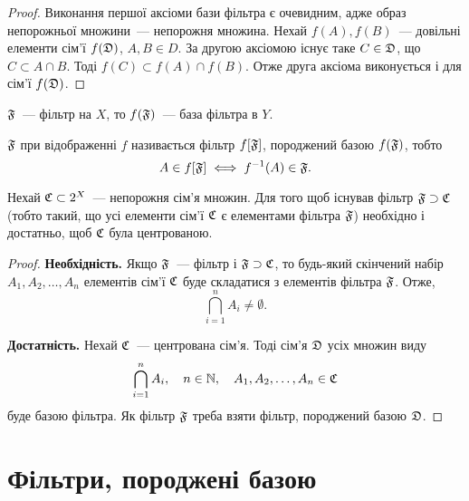 \begin{proof}
    Виконання першої аксіоми бази фільтра є очевидним, адже образ непорожньої множини~--- непорожня множина. Нехай $f(A), f(B)$~--- довільні елементи сім'ї $f(\frak D)$, $A, B \in D$. За другою аксіомою існує таке $C \in \frak D$, що $C \subset A \cap B$. Тоді $f(C) \subset f(A) \cap f(B)$. Отже друга аксіома виконується і для сім'ї $f(\frak D)$.
\end{proof}

\begin{corollary}
    $\frak F$~--- фільтр на $X$, то $f(\frak F)$~--- база фільтра в $Y$.
\end{corollary}

\begin{definition}
     $\frak F$ при відображенні $f$ називається фільтр $f[\frak F]$, породжений базою $f(\frak F)$, тобто
    \begin{equation*}
        A \in f[\frak F] \iff f\inv (A) \in \frak F.
    \end{equation*}
\end{definition}

\begin{theorem}
    Нехай $\frak C \subset 2^X$~--- непорожня сім'я множин. Для того щоб існував фільтр $\frak F \supset \frak C$ (тобто такий, що усі елементи сім'ї $\frak C$ є елементами фільтра $\frak F$) необхідно і достатньо, щоб $\frak C$ була центрованою.
\end{theorem}

\begin{proof}
    \textbf{Необхідність.} Якщо $\frak F$~--- фільтр і $\frak F \supset \frak C$, то будь-який скінчений набір $A_1, A_2, \dots, A_n$ елементів сім'ї $\frak C$ буде складатися з елементів фільтра $\frak F$. Отже, 
    \begin{equation*}
        \bigcap_{i = 1}^n A_i \ne \emptyset.
    \end{equation*}

    \textbf{Достатність.} Нехай $\frak C$~--- центрована сім'я. Тоді сім'я $\frak D$ усіх множин виду
    \begin{equation*}
        \bigcap_{i = 1}^n A_i, \quad n \in \NN, \quad A_1, A_2, \dots, A_n \in \frak C
    \end{equation*}
    буде базою фільтра. Як фільтр $\frak F$ треба взяти фільтр, породжений базою $\frak D$.
\end{proof}

\section{Фільтри, породжені базою}

